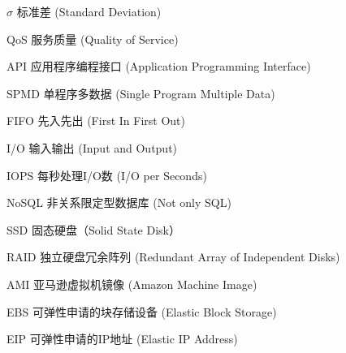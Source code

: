 \begin{denotation}[3cm]
\item[$\sigma$] 标准差 (Standard Deviation)
\item[QoS] 服务质量 (Quality of Service)
\item[API] 应用程序编程接口 (Application Programming Interface)
\item[SPMD] 单程序多数据 (Single Program Multiple Data)
\item[FIFO] 先入先出 (First In First Out)
\item[I/O] 输入输出 (Input and Output)
\item[IOPS] 每秒处理I/O数 (I/O per Seconds)
\item[NoSQL] 非关系限定型数据库 (Not only SQL)
\item[SSD] 固态硬盘（Solid State Disk）
\item[RAID] 独立硬盘冗余阵列 (Redundant Array of Independent Disks)
\item[AMI] 亚马逊虚拟机镜像 (Amazon Machine Image)
\item[EBS] 可弹性申请的块存储设备 (Elastic Block Storage)
\item[EIP] 可弹性申请的IP地址 (Elastic IP Address)
\end{denotation}
